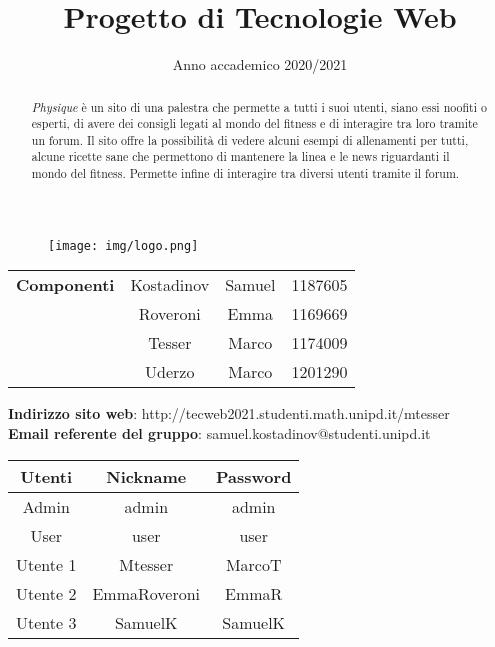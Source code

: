 
\title{Progetto di Tecnologie Web}
\author{}
\date{Anno accademico 2020/2021}


\maketitle
\begin{figure}[H]
	\centering
	\texttt{[image: img/logo.png]}
\end{figure}
\begin{table}[H]
	\centering
	\begin{tabular}{c|c c c}
		\textbf{Componenti} & Kostadinov     & Samuel  & 1187605 \\
		                    & Roveroni       & Emma    & 1169669 \\
		                    & Tesser         & Marco   & 1174009 \\
		                    & Uderzo         & Marco   & 1201290 \\
	\end{tabular}
\end{table}

\begin{center}
	\textbf{Indirizzo sito web}: http://tecweb2021.studenti.math.unipd.it/mtesser\\
	\textbf{Email referente del gruppo}: samuel.kostadinov@studenti.unipd.it
\end{center}

\begin{table}[H]
	\centering
	\begin{tabular}{c|c c}
		\textbf{Utenti} & \textbf{Nickname} & \textbf{Password} \\
		\hline
		Admin           & admin        & admin        \\
		User            & user         & user         \\
		Utente 1        & Mtesser      & MarcoT       \\
		Utente 2        & EmmaRoveroni & EmmaR        \\
		Utente 3        & SamuelK      & SamuelK      \\
	\end{tabular}
\end{table}
\newpage
{}
\tableofcontents
\newpage
{}
\renewcommand{\abstractname}{Abstract}
\begin{abstract}
	\emph{Physique} è un sito di una palestra che permette a tutti i suoi utenti, siano essi noofiti o esperti, di avere dei consigli legati al mondo del fitness e di interagire tra loro tramite un forum. \newline
	Il sito offre la possibilità di vedere alcuni esempi di allenamenti per tutti, alcune ricette sane che permettono di mantenere la linea e le news riguardanti il mondo del fitness. Permette infine di interagire tra diversi utenti tramite il forum.
\end{abstract}
\newpage

\newpage

\newpage

\newpage

\newpage


